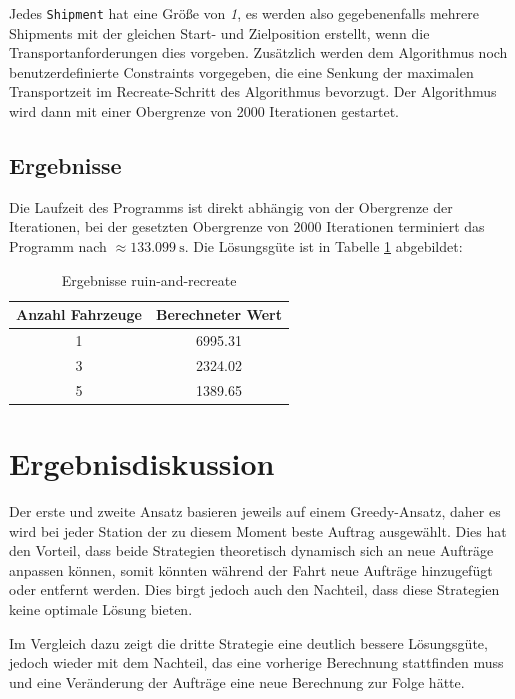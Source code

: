 \documentclass[ngerman]{tudscrreprt}
\newcommand{\code}[1]{\texttt{#1}}
\begin{document}
Jedes \code{Shipment} hat eine Größe von \emph{1}, es werden also gegebenenfalls mehrere Shipments mit der gleichen Start- und Zielposition erstellt, wenn die Transportanforderungen dies vorgeben. Zusätzlich werden dem Algorithmus noch benutzerdefinierte Constraints vorgegeben, die eine Senkung der maximalen Transportzeit im Recreate-Schritt des Algorithmus bevorzugt. Der Algorithmus wird dann mit einer Obergrenze von \num{2000} Iterationen gestartet.

\subsection{Ergebnisse}
Die Laufzeit des Programms ist direkt abhängig von der Obergrenze der Iterationen,
bei der gesetzten Obergrenze von \num{2000} Iterationen terminiert das Programm
nach $\approx \SI{133.099}{\second}$.
Die Lösungsgüte ist in Tabelle \ref{table:ruin-and-recreate} abgebildet:
%
\begin{table}[H]
    \centering
    \begin{tabular}{|c|c|}
    \hline
    Anzahl Fahrzeuge & Berechneter Wert \\ \hline
    1                & \num{6995.31}    \\ \hline
    3                & \num{2324.02}    \\ \hline
    5                & \num{1389.65}    \\ \hline
    \end{tabular}
    \caption{Ergebnisse ruin-and-recreate}
    \label{table:ruin-and-recreate}
\end{table}

\section{Ergebnisdiskussion}
Der erste und zweite Ansatz basieren jeweils auf einem Greedy-Ansatz, daher es wird bei jeder
Station der zu diesem Moment beste Auftrag ausgewählt.
Dies hat den Vorteil, dass beide Strategien theoretisch dynamisch sich an neue Aufträge anpassen
können, somit könnten während der Fahrt neue Aufträge hinzugefügt oder entfernt werden.
Dies birgt jedoch auch den Nachteil, dass diese Strategien keine optimale Lösung bieten.

Im Vergleich dazu zeigt die dritte Strategie eine deutlich bessere Lösungsgüte,
jedoch wieder mit dem Nachteil, das eine vorherige Berechnung stattfinden muss und eine
Veränderung der Aufträge eine neue Berechnung zur Folge hätte.
\end{document}
